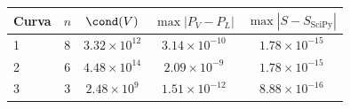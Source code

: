 \begin{tabular}{lcccc}
  \toprule
  \rowcolor{Azul1!50}
  Curva & $n$ & $\cond(V)$ & $\max|P_V-P_L|$ & $\max|S-S_{\text{SciPy}}|$ \\
  \midrule
  1 & 8 & $3.32\times10^{12}$ & $3.14\times10^{-10}$ & $1.78\times10^{-15}$ \\
  2 & 6 & $4.48\times10^{14}$ & $2.09\times10^{-9}$ & $1.78\times10^{-15}$ \\
  3 & 3 & $2.48\times10^{9}$ & $1.51\times10^{-12}$ & $8.88\times10^{-16}$ \\
  \bottomrule
\end{tabular}
